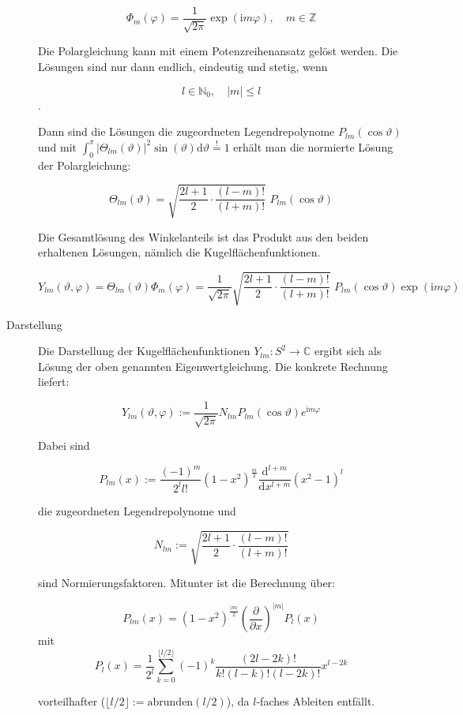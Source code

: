 \begin{definition}
\begin{description}
\[\Phi_{m}(\varphi)=\frac{1}{\sqrt{2\pi}}\exp(\mathrm im\varphi),\quad m\in\mathbb{Z}\]

Die Polargleichung kann mit einem Potenzreihenansatz gelöst werden. Die Lösungen sind nur dann endlich, eindeutig und stetig, wenn

\[l\in\mathbb{N}_{0},\quad|m|\leq l\].

Dann sind die Lösungen die zugeordneten Legendrepolynome $P_{lm}(\cos\vartheta)$ und mit $\int_{0}^{\pi}|\Theta_{lm}(\vartheta)|^{2}\sin(\vartheta)\mathrm{d}\vartheta\overset{!}{=}1$ erhält man die normierte Lösung der Polargleichung:

\[\Theta_{lm}(\vartheta)= \sqrt{\frac{2l+1}{2}\cdot\frac{(l-m)!}{(l+m)!}}\,\, P_{lm}(\cos\vartheta)\]

Die Gesamtlösung des Winkelanteils ist das Produkt aus den beiden erhaltenen Lösungen, nämlich die Kugelflächenfunktionen.

\[Y_{lm}(\vartheta,\varphi)=\Theta_{lm}(\vartheta)\Phi_{m}(\varphi)= \frac{1}{\sqrt{2\pi}} \sqrt{\frac{2l+1}{2}\cdot\frac{(l-m)!}{(l+m)!}}\,\, P_{lm}(\cos\vartheta) \exp(\mathrm im\varphi)\]

	\item[Darstellung]


Die Darstellung der Kugelflächenfunktionen $Y_{lm}: S^2\rightarrow \mathbb C $ ergibt sich als Lösung der oben genannten Eigenwertgleichung. Die konkrete Rechnung liefert:

\[Y_{lm}(\vartheta,\varphi) := \frac{1}{\sqrt{2\pi}}N_{lm} P_{lm}(\cos \vartheta)e^{\mathrm im \varphi}\]

Dabei sind

\[P_{lm} (x):=\frac{(-1)^m}{2^ll!}(1-x^2)^{\frac m2} \frac{\mathrm d^{l+m}}{\mathrm dx^{l+m}}(x^2-1)^l\]

die zugeordneten Legendrepolynome und

\[N_{lm} := \sqrt{\frac{2l+1}{2}\cdot\frac{(l-m)!}{(l+m)!}}\]

sind Normierungsfaktoren. Mitunter ist die Berechnung über:

\[P_{lm} (x)=(1-x^2)^{\frac{\left|m\right|}{2}} \left(\frac{\partial}{\partial x}\right)^{\left|m\right|} P_l(x)\]
mit
\[P_l (x)=\frac {1}{2^l}\sum_{k=0}^{\lfloor l/2\rfloor} (-1)^k \frac{(2l-2k)!}{k!(l-k)!(l-2k)!} x^{l-2k}\]

vorteilhafter ($\lfloor l/2\rfloor:={\mathrm{abrunden}}(l/2)$), da $l$-faches Ableiten entfällt.


\end{description}
\end{definition}
